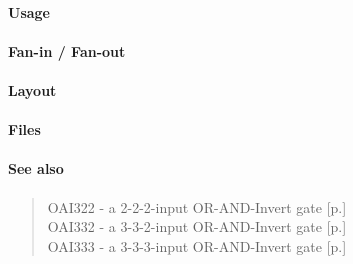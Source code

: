 \paragraph{Usage}

\paragraph{Fan-in / Fan-out}

\paragraph{Layout}

\paragraph{Files}

\paragraph{See also}
\begin{quote}
    OAI322 - a 2-2-2-input OR-AND-Invert gate [p.\pageref{OAI322}] \\
    OAI332 - a 3-3-2-input OR-AND-Invert gate [p.\pageref{OAI332}] \\
    OAI333 - a 3-3-3-input OR-AND-Invert gate [p.\pageref{OAI333}]
\end{quote}
